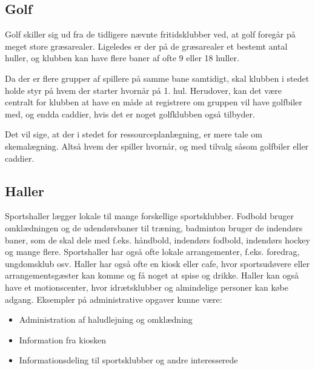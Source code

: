 \subsection{Golf}

Golf skiller sig ud fra de tidligere nævnte fritidsklubber ved, at golf foregår på meget store græsarealer. Ligeledes er
der på de græsarealer et bestemt antal huller, og klubben kan have flere baner af ofte 9 eller 18 huller.

Da der er flere grupper af spillere på samme bane samtidigt, skal klubben i stedet holde styr på hvem der starter
hvornår på 1. hul. 
Herudover, kan det være centralt for klubben at have en måde at registrere om gruppen vil have
golfbiler med, og endda caddier, hvis det er noget golfklubben også tilbyder.

Det vil sige, at der i stedet for ressourceplanlægning, er mere tale om skemalægning. Altså hvem der spiller hvornår, og
med tilvalg såsom golfbiler eller caddier.


\subsection{Haller}

Sportshaller lægger lokale til mange forskellige sportsklubber. Fodbold bruger omklædningen og de udendørsbaner til
træning, badminton bruger de indendørs baner, som de skal dele med f.eks. håndbold, indendørs fodbold, indendørs hockey
og mange flere. Sportshaller har også ofte lokale arrangementer, f.eks. foredrag, ungdomsklub osv. Haller har også ofte
en kiosk eller cafe, hvor sportsudøvere eller arrangementsgæster kan komme og få noget at spise og drikke. Haller kan
også have et motionscenter, hvor idrætsklubber og almindelige personer kan købe adgang\citep{spt_hal}. Eksempler på
administrative opgaver kunne være:

\begin{itemize}
\item Administration af haludlejning og omklædning 
\item Information fra kiosken
\item Informationsdeling til sportsklubber og andre interesserede
\end{itemize}

